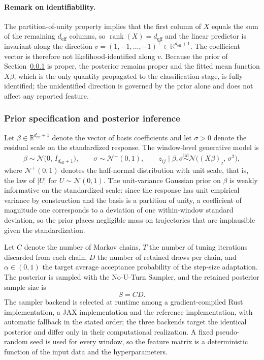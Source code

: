 \paragraph{Remark on identifiability.} The partition-of-unity property implies that the first column of $X$ equals the sum of the remaining $d_{\mathrm{eff}}$ columns, so $\operatorname{rank}(X)=d_{\mathrm{eff}}$ and the linear predictor is invariant along the direction $v=(1,-1,\dots,-1)^{\top}\in\mathbb{R}^{d_{\mathrm{eff}}+1}$. The coefficient vector is therefore not likelihood-identified along $v$. Because the prior of Section~\ref{sec:methods:prior} is proper, the posterior remains proper and the fitted mean function $X\beta$, which is the only quantity propagated to the classification stage, is fully identified; the unidentified direction is governed by the prior alone and does not affect any reported feature.

\subsubsection{Prior specification and posterior inference}
\label{sec:methods:prior}

Let $\beta\in\mathbb{R}^{d_{\mathrm{eff}}+1}$ denote the vector of basis coefficients and let $\sigma>0$ denote the residual scale on the standardized response. The window-level generative model is
$$\beta\sim\mathcal{N}\bigl(0,\,I_{d_{\mathrm{eff}}+1}\bigr),\qquad\sigma\sim\mathcal{N}^{+}(0,1),\qquad z_{ij}\mid\beta,\sigma\stackrel{\text{iid}}{\sim}\mathcal{N}\bigl((X\beta)_j,\,\sigma^2\bigr),$$
where $\mathcal{N}^{+}(0,1)$ denotes the half-normal distribution with unit scale, that is, the law of $|U|$ for $U\sim\mathcal{N}(0,1)$. The unit-variance Gaussian prior on $\beta$ is weakly informative on the standardized scale: since the response has unit empirical variance by construction and the basis is a partition of unity, a coefficient of magnitude one corresponds to a deviation of one within-window standard deviation, so the prior places negligible mass on trajectories that are implausible given the standardization.

Let $C$ denote the number of Markov chains, $T$ the number of tuning iterations discarded from each chain, $D$ the number of retained draws per chain, and $\alpha\in(0,1)$ the target average acceptance probability of the step-size adaptation. The posterior is sampled with the No-U-Turn Sampler, and the retained posterior sample size is
$$S=CD.$$
The sampler backend is selected at runtime among a gradient-compiled Rust implementation, a JAX implementation and the reference implementation, with automatic fallback in the stated order; the three backends target the identical posterior and differ only in their computational realization. A fixed pseudo-random seed is used for every window, so the feature matrix is a deterministic function of the input data and the hyperparameters.

